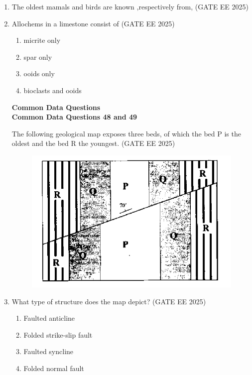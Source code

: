 \documentclass[journal]{IEEEtran}
\begin{document}
\begin{enumerate}[start=1]
\item The oldest mamals and birds are known ,respectively from,
\hfill{(GATE EE 2025)}
 \begin{enumerate}
\end{enumerate}


\item Allochems in a limestone consist of
\hfill{(GATE EE 2025)}\\
\begin{enumerate}
    \item micrite only
    \item spar only
    \item ooids only
    \item bioclasts and ooids
\end{enumerate}
\vspace{0.7cm}
\textbf{Common Data Questions}\\
\vspace{0.6cm}
\textbf{Common Data Questions 48 and 49}

 The following geological map exposes three beds, of which the bed P is the oldest and the bed R the youngest.
\hfill{(GATE EE 2025)}
\begin{figure}[H]
    \centering
    \includegraphics[width=0.5\linewidth]{figs/Screenshot from 2025-08-06 21-22-28.png}
    \caption{}
    \label{fig:}
\end{figure}
\item What type of structure does the map depict?
\hfill{(GATE EE 2025)}
\begin{enumerate}
    \item Faulted anticline
    \item Folded strike-slip fault
    \item Faulted syncline
    \item Folded normal fault
\end{enumerate}


\end{enumerate}
\end{document}
